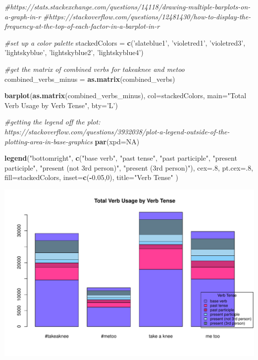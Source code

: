 \documentclass[]{article}
\newenvironment{Shaded}{\begin{snugshade}}{\end{snugshade}}
\newcommand{\KeywordTok}[1]{\textcolor[rgb]{0.13,0.29,0.53}{\textbf{#1}}}
\newcommand{\DataTypeTok}[1]{\textcolor[rgb]{0.13,0.29,0.53}{#1}}
\newcommand{\DecValTok}[1]{\textcolor[rgb]{0.00,0.00,0.81}{#1}}
\newcommand{\FloatTok}[1]{\textcolor[rgb]{0.00,0.00,0.81}{#1}}
\newcommand{\StringTok}[1]{\textcolor[rgb]{0.31,0.60,0.02}{#1}}
\newcommand{\CommentTok}[1]{\textcolor[rgb]{0.56,0.35,0.01}{\textit{#1}}}
\newcommand{\OtherTok}[1]{\textcolor[rgb]{0.56,0.35,0.01}{#1}}
\newcommand{\OperatorTok}[1]{\textcolor[rgb]{0.81,0.36,0.00}{\textbf{#1}}}
\newcommand{\NormalTok}[1]{#1}
\begin{document}
\begin{Shaded}
\begin{Highlighting}[]
\CommentTok{#https://stats.stackexchange.com/questions/14118/drawing-multiple-barplots-on-a-graph-in-r}
\CommentTok{#https://stackoverflow.com/questions/12481430/how-to-display-the-frequency-at-the-top-of-each-factor-in-a-barplot-in-r}

\CommentTok{#set up a color palette}
\NormalTok{stackedColors =}\StringTok{ }\KeywordTok{c}\NormalTok{(}\StringTok{'slateblue1'}\NormalTok{, }\StringTok{'violetred1'}\NormalTok{, }\StringTok{'violetred3'}\NormalTok{, }\StringTok{'lightskyblue'}\NormalTok{, }\StringTok{'lightskyblue2'}\NormalTok{, }\StringTok{'lightskyblue4'}\NormalTok{)}


\CommentTok{#get the matrix of combined verbs for takeaknee and metoo}
\NormalTok{combined_verbs_minus =}\StringTok{ }\KeywordTok{as.matrix}\NormalTok{(combined_verbs)}


\KeywordTok{barplot}\NormalTok{(}\KeywordTok{as.matrix}\NormalTok{(combined_verbs_minus), }\DataTypeTok{col=}\NormalTok{stackedColors, }\DataTypeTok{main=}\StringTok{"Total Verb Usage by Verb Tense"}\NormalTok{,  }\DataTypeTok{bty=}\StringTok{'L'}\NormalTok{)}

\CommentTok{#getting the legend off the plot: https://stackoverflow.com/questions/3932038/plot-a-legend-outside-of-the-plotting-area-in-base-graphics}
\KeywordTok{par}\NormalTok{(}\DataTypeTok{xpd=}\OtherTok{NA}\NormalTok{)}

\KeywordTok{legend}\NormalTok{(}\StringTok{"bottomright"}\NormalTok{, }\KeywordTok{c}\NormalTok{(}\StringTok{"base verb"}\NormalTok{, }\StringTok{"past tense"}\NormalTok{,  }\StringTok{"past participle"}\NormalTok{, }\StringTok{"present participle"}\NormalTok{, }\StringTok{"present (not 3rd person)"}\NormalTok{, }\StringTok{"present (3rd person)"}\NormalTok{), }\DataTypeTok{cex=}\NormalTok{.}\DecValTok{8}\NormalTok{, }\DataTypeTok{pt.cex=}\NormalTok{.}\DecValTok{8}\NormalTok{, }\DataTypeTok{fill=}\NormalTok{stackedColors, }\DataTypeTok{inset=}\KeywordTok{c}\NormalTok{(}\OperatorTok{-}\FloatTok{0.05}\NormalTok{,}\DecValTok{0}\NormalTok{), }\DataTypeTok{title=}\StringTok{"Verb Tense"}\NormalTok{ )}
\end{Highlighting}
\end{Shaded}

\includegraphics{figure/get_plot_verb_types_stacked-1.pdf}
\end{document}

